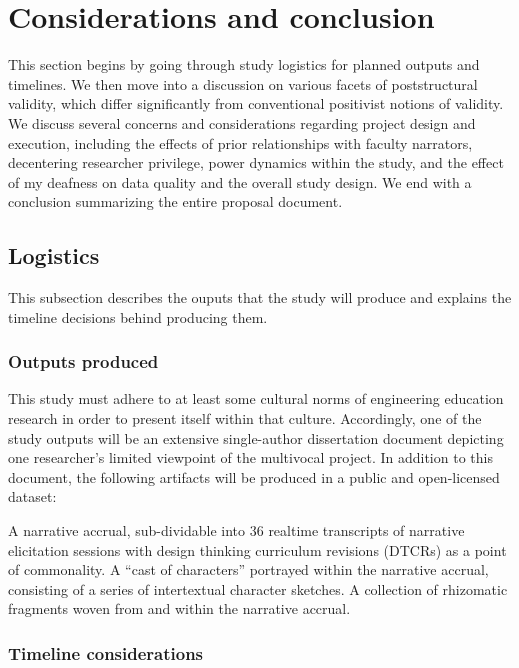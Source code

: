 \section{Considerations and conclusion}

This section begins by going through study logistics for planned outputs and timelines. We then move into a discussion on various facets of poststructural validity, which differ significantly from conventional positivist notions of validity. We discuss several concerns and considerations regarding project design and execution, including the effects of prior relationships with faculty narrators, decentering researcher privilege, power dynamics within the study, and the effect of my deafness on data quality and the overall study design. We end with a conclusion summarizing the entire proposal document.

\subsection{Logistics}

This subsection describes the ouputs that the study will produce and explains the timeline decisions behind producing them.

\subsubsection{Outputs produced}

This study must adhere to at least some cultural norms of engineering education research in order to present itself within that culture. Accordingly, one of the study outputs will be an extensive single-author dissertation document depicting one researcher’s limited viewpoint of the multivocal project. In addition to this document, the following artifacts will be produced in a public and open-licensed dataset:

A narrative accrual, sub-dividable into 36 realtime transcripts of narrative elicitation sessions with design thinking curriculum revisions (DTCRs) as a point of commonality.
A “cast of characters” portrayed within the narrative accrual, consisting of a series of intertextual character sketches.
A collection of rhizomatic fragments woven from and within the narrative accrual.

\subsubsection{Timeline considerations}

